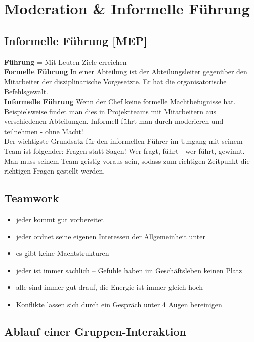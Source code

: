\chapter{Moderation \& Informelle Führung}

\section{Informelle Führung [MEP]}

\textbf{Führung} = Mit Leuten Ziele erreichen \\

\textbf{Formelle Führung} In einer Abteilung ist der Abteilungsleiter gegenüber den Mitarbeiter der disziplinarische Vorgesetzte. Er hat die organisatorische Befehlsgewalt.\\

\textbf{Informelle Führung} Wenn der Chef keine formelle Machtbefugnisse hat. Beispielsweise findet man dies in Projektteams mit Mitarbeitern aus verschiedenen Abteilungen. Informell führt man durch moderieren und teilnehmen - ohne Macht!\\

Der wichtigste Grundsatz für den informellen Führer im Umgang mit seinem Team ist folgender: Fragen statt Sagen! Wer fragt, führt - wer führt, gewinnt. Man muss seinem Team geistig voraus sein, sodass zum richtigen Zeitpunkt die richtigen Fragen gestellt werden.

\section{Teamwork}

\begin{itemize}
	\item jeder kommt gut vorbereitet
	\item jeder ordnet seine eigenen Interessen der Allgemeinheit unter
	\item es gibt keine Machtstrukturen
	\item jeder ist immer sachlich -- Gefühle haben im Geschäftsleben keinen Platz
	\item alle sind immer gut drauf, die Energie ist immer gleich hoch
	\item Konflikte lassen sich durch ein Gespräch unter 4 Augen bereinigen
\end{itemize}

\section{Ablauf einer Gruppen-Interaktion}

